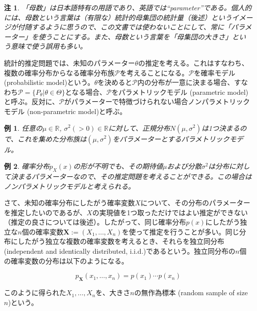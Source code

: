\documentclass[uplatex,dvipdfmx]{jlreq}
\newcommand\term[1]{\textsf{#1}}
\newtheorem{example}{例}
\newtheorem{note}{注}
\begin{document}
\begin{note}
    「母数」は日本語特有の用語であり、英語では``parameter''である。個人的には、母数という言葉は（有限な）統計的母集団の統計量（後述）というイメージが付随するように思うので、この文書では使わないことにして、常に「パラメーター」を使うことにする。また、母数という言葉を「母集団の大きさ」という意味で使う誤用も多い。
\end{note}

統計的推定問題では、未知のパラメーター$\theta$の推定を考える。これはすなわち、複数の確率分布からなる確率分布族$\mathcal{P}$を考えることになる。$\mathcal{P}$を\term{確率モデル (probabilistic model)}という。$\theta$を決めると$\mathcal{P}$内の分布が一意に決まる場合、すなわち$\mathcal{P} = \{ P_\theta | \theta \in \Theta \}$となる場合、$\mathcal{P}$を\term{パラメトリックモデル (parametric model)}と呼ぶ。反対に、$\mathcal{P}$がパラメーターで特徴づけられない場合\term{ノンパラメトリックモデル (non-parametric model)}と呼ぶ。

\begin{example}
    任意の$\mu\in\mathbb{R}$, $\sigma^2(>0)\in\mathbb{R}$に対して、正規分布$N(\mu, \sigma^2)$は1つ決まるので、これを集めた分布族は$(\mu, \sigma^2)$をパラメーターとするパラメトリックモデル。
\end{example}

\begin{example}
    確率分布$p_X(x)$の形が不明でも、その期待値$\mu$および分散$\sigma^2$は分布に対して決まるパラメーターなので、その推定問題を考えることができる。この場合はノンパラメトリックモデルと考えられる。
\end{example}

さて、未知の確率分布にしたがう確率変数$X$について、その分布のパラメーターを推定したいのであるが、$X$の実現値を1つ取っただけではよい推定ができない（推定の良さについては後述）。したがって、同じ確率分布$p(x)$にしたがう独立な$n$個の確率変数$\boldsymbol{X} := (X_1, \dotsc, X_n)$を使って推定を行うことが多い。同じ分布にしたがう独立な複数の確率変数を考えるとき、それらを\term{独立同分布 (independent and identically distributed, i.i.d.)}であるという。独立同分布の$n$個の確率変数の分布は以下のようになる。

\begin{equation}
    p_{\boldsymbol{X}}(x_1, \dotsc, x_n) = p(x_1) \dotsm p(x_n)
\end{equation}

このように得られた$X_1, \dotsc, X_n$を、\term{大きさ$n$の無作為標本 (random sample of size $n$)}という。
\end{document}
